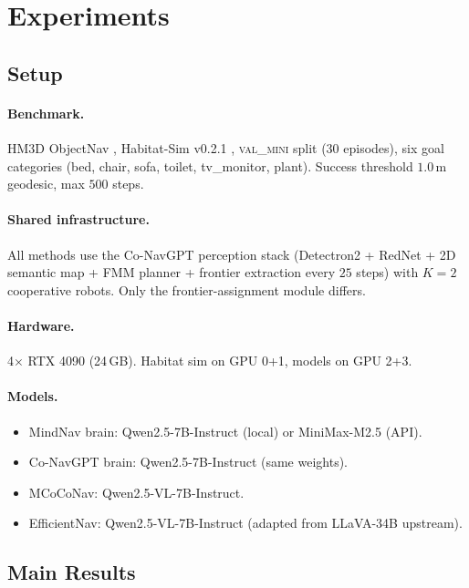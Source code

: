\section{Experiments}

\subsection{Setup}
\paragraph{Benchmark.} HM3D ObjectNav \citep{hm3d}, Habitat-Sim v0.2.1
\citep{habitat}, \textsc{val\_mini} split (30 episodes), six goal categories
(bed, chair, sofa, toilet, tv\_monitor, plant). Success threshold
$1.0$\,m geodesic, max $500$ steps.

\paragraph{Shared infrastructure.} All methods use the Co-NavGPT perception
stack (Detectron2 + RedNet + 2D semantic map + FMM planner + frontier
extraction every $25$ steps) with $K{=}2$ cooperative robots. Only the
frontier-assignment module differs.

\paragraph{Hardware.} 4$\times$ RTX 4090 (24\,GB). Habitat sim on GPU 0+1,
models on GPU 2+3.

\paragraph{Models.}
\begin{itemize}
    \item MindNav brain: Qwen2.5-7B-Instruct (local) or MiniMax-M2.5 (API).
    \item Co-NavGPT brain: Qwen2.5-7B-Instruct (same weights).
    \item MCoCoNav: Qwen2.5-VL-7B-Instruct.
    \item EfficientNav: Qwen2.5-VL-7B-Instruct (adapted from LLaVA-34B
          upstream).
\end{itemize}

\subsection{Main Results}


